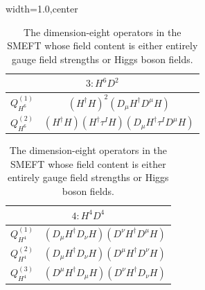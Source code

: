 \begin{table}[H]
\begin{center}
\begin{adjustbox}{width=1.0\textwidth,center}
\begin{minipage}[t]{5.6cm}
\renewcommand{\arraystretch}{1.5}
\begin{tabular}[t]{c|c}
\multicolumn{2}{c}{\boldmath$3:H^6D^2$} \\
\hline
$Q_{H^6}^{(1)}$  & $(H^{\dag} H)^2 (D_{\mu} H^{\dag} D^{\mu} H)$ \\
% 
$Q_{H^6}^{(2)}$  & $(H^{\dag} H) (H^{\dag} \tau^I H) (D_{\mu} H^{\dag} \tau^I D^{\mu} H)$
\end{tabular}
\end{minipage}
\hspace{1cm}
\begin{minipage}[t]{4.9cm}
\renewcommand{\arraystretch}{1.5}
\begin{tabular}[t]{c|c}
\multicolumn{2}{c}{\boldmath$4:H^4D^4$} \\
\hline
$Q_{H^4}^{(1)}$  &  $(D_{\mu} H^{\dag} D_{\nu} H) (D^{\nu} H^{\dag} D^{\mu} H)$ \\ 
%
$Q_{H^4}^{(2)}$  &  $(D_{\mu} H^{\dag} D_{\nu} H) (D^{\mu} H^{\dag} D^{\nu} H)$ \\ 
%
$Q_{H^4}^{(3)}$  &  $(D^{\mu} H^{\dag} D_{\mu} H) (D^{\nu} H^{\dag} D_{\nu} H)$
\end{tabular}
\end{minipage}
\end{adjustbox}
\end{center}
\caption{The dimension-eight operators in the SMEFT whose field content is either entirely gauge field strengths or Higgs boson fields.}
\label{tab:smeft8class_1_2_3_4}
\end{table}
